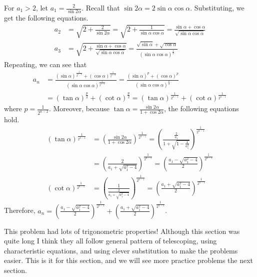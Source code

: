 \documentclass[../../../main.tex]{subfiles}
\begin{document}
\begin{solution}
For $a_1 > 2$, let $a_1 = \frac{2}{\sin2\alpha}$. Recall that
$\sin2\alpha = 2\sin\alpha\cos\alpha$. Substituting, we get the
following equations.
\begin{align*}
    a_2
    &= \sqrt{2 + \frac{2}{\sin2\alpha}}
    = \sqrt{2 + \frac{1}{\sin\alpha\cos\alpha}}
    = \frac{\sin\alpha + \cos\alpha}{\sqrt{\sin\alpha\cos\alpha}} \\
    a_3
    &= \sqrt{2 +
        \frac{\sin\alpha + \cos\alpha}{\sqrt{\sin\alpha\cos\alpha}}
    }
    = \frac{
        \sqrt{\sin\alpha} + \sqrt{\cos\alpha}
    }{(\sin\alpha\cos\alpha)^\frac{1}{4}}
\end{align*}
Repeating, we can see that
\begin{align*}
    a_n
    &= \frac{
        (\sin\alpha)^\frac{1}{2^{n-2}} +
        (\cos\alpha)^\frac{1}{2^{n-2}}
    }{ (\sin\alpha\cos\alpha)^\frac{1}{2^{n-1}} }
    = \frac{
        (\sin\alpha)^p +
        (\cos\alpha)^p
    }{ (\sin\alpha\cos\alpha)^\frac{p}{2} } \\
    &= (\tan\alpha)^\frac{p}{2} + (\cot\alpha)^\frac{p}{2}
    = (\tan\alpha)^\frac{1}{2^{n-1}} + (\cot\alpha)^\frac{1}{2^{n-1}}
\end{align*}
where $p = \frac{1}{2^{n-2}}$. Moreover, because $\tan\alpha =
\frac{\sin2\alpha}{1 + \cos2\alpha}$, the following equations hold.
\begin{align*}
    (\tan\alpha)^\frac{1}{2^{n-1}}
    &= \left(
        \frac{\sin2\alpha}{1 + \cos2\alpha}
    \right)^\frac{1}{2^{n-1}}
    = \left(
        \frac{ \frac{2}{a_1} }{ 1 + \sqrt{1 - \frac{4}{a_1^2}} }
    \right)^\frac{1}{2^{n-1}} \\
    &= \left(
        \frac{2}{a_1 + \sqrt{a_1^2 - 4}}
    \right)^\frac{1}{2^{n-1}}
    = \left(
        \frac{a_1 - \sqrt{a_1^2 - 4}}{2}
    \right)^\frac{1}{2^{n-1}} \\
    (\cot\alpha)^\frac{1}{2^{n-1}}
    &= \left(
        \frac{1}{ \frac{2}{a_1 + \sqrt{a_1^2 - 4}} }
    \right)^\frac{1}{2^{n-1}}
    = \left(
        \frac{a_1 + \sqrt{a_1^2 - 4}}{2}
    \right)^\frac{1}{2^{n-1}}
\end{align*}
Therefore, $a_n = \left( \frac{a_1 - \sqrt{a_1^2 - 4}}{2}
\right)^\frac{1}{2^{n-1}} + \left( \frac{a_1 + \sqrt{a_1^2 - 4}}{2}
\right)^\frac{1}{2^{n-1}}$.
\end{solution}

This problem had lots of trigonometric properties! Although this
section was quite long I think they all follow general pattern of
telescoping, using characteristic equations, and using clever
substitution to make the problems easier. This is it for this
section, and we will see more practice problems the next section.
\end{document}
